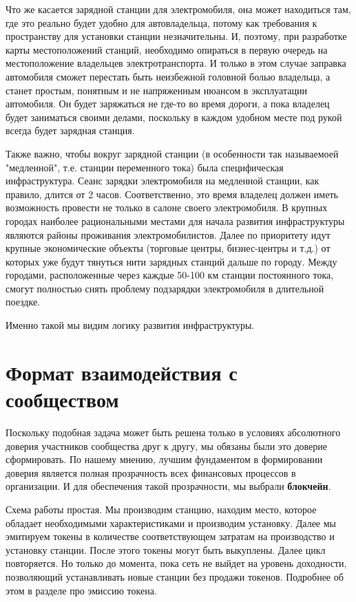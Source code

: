 \documentclass[a4paper,12pt]{report}
\begin{document}
Что же касается зарядной станции для электромобиля, она может находиться там, где это реально будет удобно для автовладельца, потому как требования к пространству для установки станции незначительны. И, поэтому, при разработке карты местоположений станций, необходимо опираться в первую очередь на местоположение владельцев электротранспорта. И только в этом случае заправка автомобиля сможет перестать быть неизбежной головной болью владельца, а станет простым, понятным и не напряженным нюансом в эксплуатации автомобиля. Он будет заряжаться не где-то во время дороги, а пока владелец будет заниматься своими делами, поскольку в каждом удобном месте под рукой всегда будет зарядная станция.

Также важно, чтобы вокруг зарядной станции (в особенности так называемоей "медленной", т.е. станции переменного тока) была специфическая инфраструктура. Сеанс зарядки электромобиля на медленной станции, как правило, длится от 2 часов. Соответственно, это время владелец должен иметь возможность провести не только в салоне своего электромобиля. В крупных городах наиболее рациональными местами для начала развития инфраструктуры являются районы проживания электромобилистов. Далее по приоритету идут крупные экономические объекты (торговые центры, бизнес-центры и т.д.) от которых уже будут тянуться нити зарядных станций дальше по городу. Между городами, расположенные через каждые 50-100 км станции постоянного тока, смогут полностью снять проблему подзарядки электромобиля в длительной поездке. 

Именно такой мы видим логику развития инфраструктуры.


\vspace*{1cm}

\chapter{Формат взаимодействия с сообществом}
Поскольку подобная задача может быть решена только в условиях абсолютного доверия участников сообщества друг к другу, мы обязаны были это доверие сформировать. По нашему мнению, лучшим фундаментом в формировании доверия является полная прозрачность всех финансовых процессов в организации. И для обеспечения такой прозрачности, мы выбрали \textbf{блокчейн}. 

Схема работы простая. Мы производим станцию, находим место, которое обладает необходимыми характеристиками и производим установку. Далее мы эмитируем токены в количестве соответствующем затратам на производство и установку станции. После этого токены могут быть выкуплены. Далее цикл повторяется. Но только до момента, пока сеть не выйдет на уровень доходности, позволяющий устанавливать новые станции без продажи токенов. Подробнее об этом в разделе про эмиссию токена. 
\end{document}
